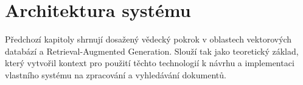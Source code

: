 




\chapter{Architektura systému}
\label{navrh}
Předchozí kapitoly shrnují dosažený vědecký pokrok v oblastech vektorových databází a Retrieval-Augmented Generation. Slouží tak jako teoretický základ, který vytvořil kontext pro použití těchto technologií k návrhu a implementaci vlastního systému na zpracování a vyhledávání dokumentů. 

